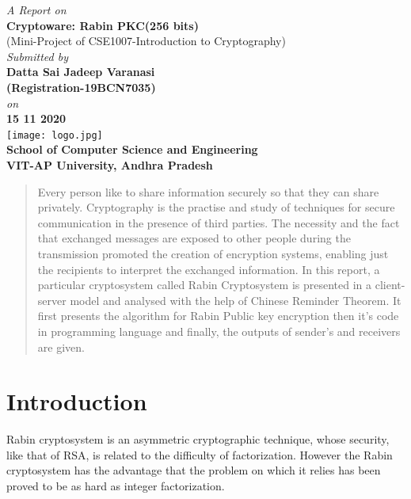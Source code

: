 \documentclass[12pt,a4paper]{article}
\begin{document}
\thispagestyle{empty} %
\begin{center}
\Large {\it A Report on}\\
\vspace{1cm}
\Huge {\bf Cryptoware: Rabin PKC(256 bits)}\\
\Large {(Mini-Project of CSE1007-Introduction to Cryptography)}\\
\vspace{1in}
\Large {\it Submitted by}\\
\Large {\bf Datta Sai Jadeep Varanasi}\\
\large {\bf (Registration-19BCN7035)}\\
\Large {\it on}\\
\Large {\bf 15 11 2020}\\
\vspace{2in}
\texttt{[image: logo.jpg]}\\
\vspace{1in}
\Large {\bf School of Computer Science and Engineering}\\
\Large {\bf VIT-AP University, Andhra Pradesh}\\
\end{center}

\newpage %

\begin{abstract}
Every person like to share information securely so that they can
share privately. 
Cryptography is the practise and study of techniques
for secure communication in the presence of third parties. The
necessity and the fact that exchanged messages are exposed to
other people during the transmission promoted the creation of
encryption systems, enabling just the recipients to interpret the
exchanged information.
In this report, a particular cryptosystem called Rabin
Cryptosystem is presented in a client-server model and analysed with
the help of Chinese Reminder Theorem.
It first presents the algorithm for Rabin Public key encryption
then it's code in programming language and finally, the outputs of
sender's and receivers are given.
\end{abstract}

\section{Introduction}
Rabin cryptosystem is an asymmetric cryptographic
technique, whose security, like that of RSA, is related to the
difficulty of factorization. However the Rabin cryptosystem has
the advantage that the problem on which it relies has been proved
to be as hard as integer factorization.
\end{document}
